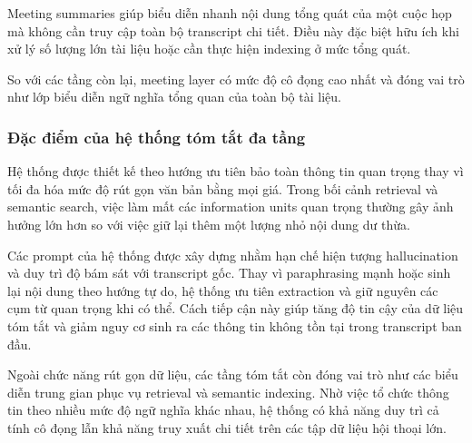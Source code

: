 Meeting summaries giúp biểu diễn nhanh nội dung tổng quát của một cuộc họp mà không cần truy cập toàn bộ transcript chi tiết. Điều này đặc biệt hữu ích khi xử lý số lượng lớn tài liệu hoặc cần thực hiện indexing ở mức tổng quát.

So với các tầng còn lại, meeting layer có mức độ cô đọng cao nhất và đóng vai trò như lớp biểu diễn ngữ nghĩa tổng quan của toàn bộ tài liệu.

\subsubsection{Đặc điểm của hệ thống tóm tắt đa tầng}

Hệ thống được thiết kế theo hướng ưu tiên bảo toàn thông tin quan trọng thay vì tối đa hóa mức độ rút gọn văn bản bằng mọi giá. Trong bối cảnh retrieval và semantic search, việc làm mất các information units quan trọng thường gây ảnh hưởng lớn hơn so với việc giữ lại thêm một lượng nhỏ nội dung dư thừa.

Các prompt của hệ thống được xây dựng nhằm hạn chế hiện tượng hallucination và duy trì độ bám sát với transcript gốc. Thay vì paraphrasing mạnh hoặc sinh lại nội dung theo hướng tự do, hệ thống ưu tiên extraction và giữ nguyên các cụm từ quan trọng khi có thể. Cách tiếp cận này giúp tăng độ tin cậy của dữ liệu tóm tắt và giảm nguy cơ sinh ra các thông tin không tồn tại trong transcript ban đầu.

Ngoài chức năng rút gọn dữ liệu, các tầng tóm tắt còn đóng vai trò như các biểu diễn trung gian phục vụ retrieval và semantic indexing. Nhờ việc tổ chức thông tin theo nhiều mức độ ngữ nghĩa khác nhau, hệ thống có khả năng duy trì cả tính cô đọng lẫn khả năng truy xuất chi tiết trên các tập dữ liệu hội thoại lớn.